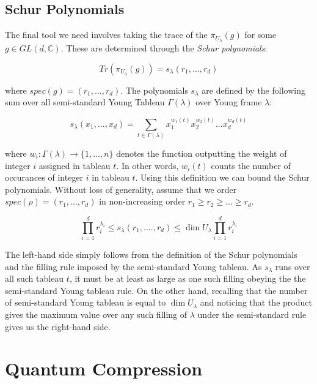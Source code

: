 \documentclass[11pt]{article}%
\begin{document}
\subsection{Schur Polynomials}
The final tool we need involves taking the trace of the $\pi_{U_{\lambda}}(g)$ for some $g \in GL(d, \mathbb{C})$. These are determined through the \textit{Schur polynomials}:

\begin{equation}\label{schurdef}
    Tr(\pi_{U_\lambda}(g)) = s_{\lambda}(r_1,...,r_d)
\end{equation}

\noindent where $spec(g) = (r_1,...,r_d)$. The polynomials $s_\lambda$ are defined by the following sum over all semi-standard Young Tableau $\Gamma(\lambda)$ over Young frame $\lambda$:

\begin{equation}
  s_{\lambda}(x_1,...,x_d) = \sum_{t \in \Gamma(\lambda)} x_1^{w_1(t)}x_2^{w_2(t)}...x_d^{w_d(t)}
\end{equation}

\noindent where $w_i: \Gamma(\lambda) \rightarrow \{1,...,n\}$ denotes the function outputting the weight of integer $i$ assigned in tableau $t$. In other words, $w_i(t)$ counts the number of occurances of integer $i$ in tableau $t$. Using this definition we can bound the Schur polynomials. Without loss of generality, assume that we order $spec(\rho) = (r_1,...,r_d)$ in non-increasing order $r_1 \geq r_2 \geq ... \geq r_d$.

\begin{equation} \label{schur}
  \prod_{i=1}^d r_i^{\lambda_i} \leq s_{\lambda}(r_1,....,r_d) \leq \dim{U_\lambda} \prod_{i=1}^d r_i^{\lambda_i}
\end{equation}

The left-hand side simply follows from the definition of the Schur polynomials and the filling rule imposed by the semi-standard Young tableau. As $s_\lambda$ runs over all such tableau $t$, it must be at least as large as one such filling obeying the the semi-standard Young tableau rule.
On the other hand, recalling that the number of semi-standard Young tableau is equal to $\dim U_{\lambda}$ and noticing that the product gives the maximum value over any such filling of $\lambda$ under the semi-standard rule gives us the right-hand side.

\section{Quantum Compression}
\end{document}
